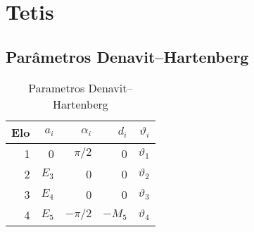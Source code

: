 \chapter{Tetis}

\section{Parâmetros Denavit–Hartenberg}
\begin{table}[h!]
\centering
\caption{Parametros Denavit–Hartenberg}
\label{my-label}
\begin{tabular}{rrrrr} \hline
Elo & $a_i$ & $\alpha_i$ & $d_i$  & $\vartheta_i$ \\ \hline
1   & 0     & $\pi/2$    & 0      & $\vartheta_1$ \\
2   & $E_3$ & 0          & 0      & $\vartheta_2$ \\
3   & $E_4$ & 0          & 0      & $\vartheta_3$ \\
4   & $E_5$ & $-\pi/2$   & $-M_5$ & $\vartheta_4$ \\ \hline
\end{tabular}
\end{table}

